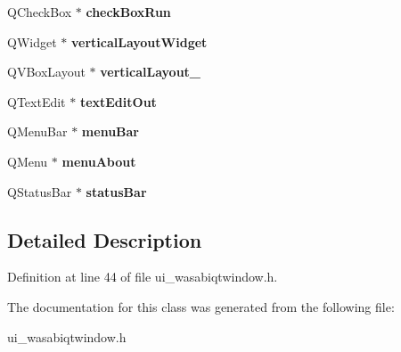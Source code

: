 \begin{DoxyCompactItemize}
\item 
\hypertarget{class_ui___w_a_s_a_b_i_qt_window_ad21570715a94ed80cb6d84cc6cb29003}{
\-Q\-Check\-Box $\ast$ {\bfseries check\-Box\-Run}}
\label{class_ui___w_a_s_a_b_i_qt_window_ad21570715a94ed80cb6d84cc6cb29003}

\item 
\hypertarget{class_ui___w_a_s_a_b_i_qt_window_aad2cc90b16681ebec25595d08385b3d1}{
\-Q\-Widget $\ast$ {\bfseries vertical\-Layout\-Widget}}
\label{class_ui___w_a_s_a_b_i_qt_window_aad2cc90b16681ebec25595d08385b3d1}

\item 
\hypertarget{class_ui___w_a_s_a_b_i_qt_window_aacb4a73b86f11e9cfe6029773e4a7b6e}{
\-Q\-V\-Box\-Layout $\ast$ {\bfseries vertical\-Layout\-\_}}
\label{class_ui___w_a_s_a_b_i_qt_window_aacb4a73b86f11e9cfe6029773e4a7b6e}

\item 
\hypertarget{class_ui___w_a_s_a_b_i_qt_window_ad20a52b99258f57ff6ff99dfa50217e7}{
\-Q\-Text\-Edit $\ast$ {\bfseries text\-Edit\-Out}}
\label{class_ui___w_a_s_a_b_i_qt_window_ad20a52b99258f57ff6ff99dfa50217e7}

\item 
\hypertarget{class_ui___w_a_s_a_b_i_qt_window_a16d85b8ae22b9f58f664f0b080b5e3f5}{
\-Q\-Menu\-Bar $\ast$ {\bfseries menu\-Bar}}
\label{class_ui___w_a_s_a_b_i_qt_window_a16d85b8ae22b9f58f664f0b080b5e3f5}

\item 
\hypertarget{class_ui___w_a_s_a_b_i_qt_window_af0ead05deed8a7e23ad664042ea456d6}{
\-Q\-Menu $\ast$ {\bfseries menu\-About}}
\label{class_ui___w_a_s_a_b_i_qt_window_af0ead05deed8a7e23ad664042ea456d6}

\item 
\hypertarget{class_ui___w_a_s_a_b_i_qt_window_aebdc712a3f2c8e1d316a1c16a2673a8a}{
\-Q\-Status\-Bar $\ast$ {\bfseries status\-Bar}}
\label{class_ui___w_a_s_a_b_i_qt_window_aebdc712a3f2c8e1d316a1c16a2673a8a}

\end{DoxyCompactItemize}


\subsection{\-Detailed \-Description}


\-Definition at line 44 of file ui\-\_\-wasabiqtwindow.\-h.



\-The documentation for this class was generated from the following file\-:\begin{DoxyCompactItemize}
\item 
ui\-\_\-wasabiqtwindow.\-h\end{DoxyCompactItemize}
